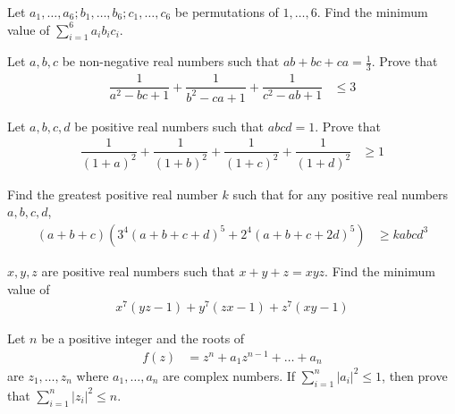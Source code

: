 \documentclass{subfile}
\begin{document}
		\begin{problem}
			Let $a_{1},\ldots,a_{6};b_{1},\ldots,b_{6};c_{1},\ldots,c_{6}$ be permutations of $1,\ldots,6$. Find the minimum value of $\sum_{i=1}^{6}a_{i}b_{i}c_{i}$.
		\end{problem}
	
		\begin{problem}
			Let $a,b,c$ be non-negative real numbers such that $ab+bc+ca=\frac{1}{3}$. Prove that
				\begin{align*}
					\dfrac{1}{a^{2}-bc+1}+\dfrac{1}{b^{2}-ca+1}+\dfrac{1}{c^{2}-ab+1}
						& \leq 3
				\end{align*}
		\end{problem}
	
		\begin{problem}
			Let $a,b,c,d$ be positive real numbers such that $abcd=1$. Prove that
				\begin{align*}
					\dfrac{1}{(1+a)^{2}}+\dfrac{1}{(1+b)^{2}}+\dfrac{1}{(1+c)^{2}}+\dfrac{1}{(1+d)^{2}}
						& \geq 1
				\end{align*}
		\end{problem}
	
		\begin{problem}
			Find the greatest positive real number $k$ such that for any positive real numbers $a,b,c,d$,
				\begin{align*}
					(a+b+c)\left(3^{4}(a+b+c+d)^{5}+2^{4}(a+b+c+2d)^{5}\right)
						& \geq kabcd^{3}
				\end{align*}
		\end{problem}
	
		\begin{problem}
			$x,y,z$ are positive real numbers such that $x+y+z=xyz$. Find the minimum value of
				\begin{align*}
					x^{7}(yz-1)+y^{7}(zx-1)+z^{7}(xy-1)
				\end{align*}
		\end{problem}
	
		\begin{problem}
			Let $n$ be a positive integer and the roots of
				\begin{align*}
					f(z)
						& = z^{n}+a_{1}z^{n-1}+\ldots+a_{n}
				\end{align*}
			are $z_{1},\ldots,z_{n}$ where $a_{1},\ldots,a_{n}$ are complex numbers. If $\sum_{i=1}^{n}|a_{i}|^{2}\leq 1$, then prove that $\sum_{i=1}^{n}|z_{i}|^{2}\leq n$.
		\end{problem}
	
\end{document}
